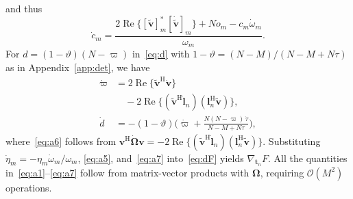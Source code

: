 \documentclass[journal]{IEEEtran}
\newcommand{\RE}{\operatorname{Re}}
\newcommand{\bt}{\mathbf{t}}
\newcommand{\bv}{\mathbf{v}}
\newcommand{\bl}{\mathbf{l}}
\newcommand{\bOm}{\boldsymbol{\Omega}}
\begin{document}
and thus
\begin{equation}\label{eq:a5}
\dot c_m=\frac{2\RE\big\{[\tilde{\bv}]_m^{\mathrm{*}}[\dot{\tilde{\bv}}]_m\big\}+N\dot o_m-c_m\dot\omega_m}{\omega_m}.
\end{equation}
For $d=(1-\vartheta)(N-\varpi)$ in~\eqref{eq:d} with $1-\vartheta=(N-M)/(N-M+N\tau)$ as in Appendix~\ref{app:det}, we have
\begin{align}
\dot\varpi&=2\RE\{\tilde{\bv}^{\mathrm{H}}\dot{\bv}\}\nonumber\\
&\quad-2\RE\big\{
 (\tilde{\bv}^{\mathrm{H}}\dot{\bl}_n)
 (\bl_n^{\mathrm{H}}\tilde{\bv})\big\},\label{eq:a6}\\
\dot d&=-(1-\vartheta)\bigg(\dot\varpi+\frac{N(N-\varpi)\,\dot\tau}{N-M+N\tau}\bigg),\label{eq:a7}
\end{align}
where~\eqref{eq:a6} follows from $\bv^{\mathrm{H}}\dot{\bOm}\bv=-2\RE\{(\tilde{\bv}^{\mathrm{H}}\dot{\bl}_n)(\bl_n^{\mathrm{H}}\tilde{\bv})\}$. Substituting $\dot\eta_m=-\eta_m\dot\omega_m/\omega_m$, \eqref{eq:a5}, and~\eqref{eq:a7} into~\eqref{eq:dF} yields $\nabla_{\bt_n}F$. All the quantities in~\eqref{eq:a1}--\eqref{eq:a7} follow from matrix-vector products with $\bOm$, requiring $\mathcal O(M^2)$ operations.
\end{document}
